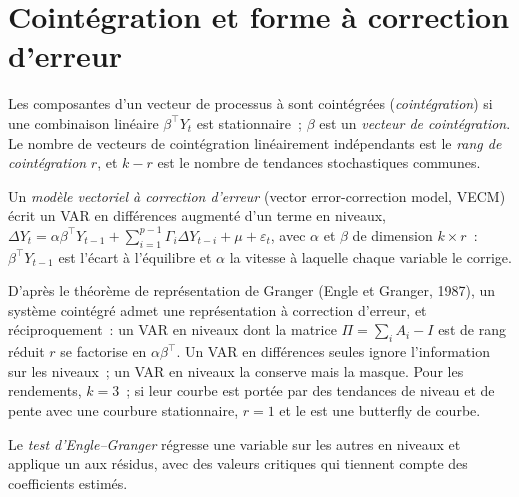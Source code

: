 \section{Cointégration et forme à correction d'erreur}

\begin{definition}\label{def:qm:multivariate-series-and-cointegration:coint}
Les composantes d'un vecteur de processus à  sont cointégrées (\emph{cointégration}) si une combinaison linéaire $\beta^\top Y_t$ est
stationnaire~; $\beta$ est un \emph{vecteur de cointégration}. Le nombre de vecteurs de cointégration linéairement indépendants est le
\emph{rang de cointégration} $r$, et $k - r$ est le nombre de tendances stochastiques communes.
\end{definition}

\begin{definition}\label{def:qm:multivariate-series-and-cointegration:vecm}
Un \emph{modèle vectoriel à correction d'erreur} (vector error-correction model, VECM) écrit un VAR en différences augmenté d'un terme en niveaux, $\Delta Y_t = \alpha\beta^\top Y_{t-1} +
\sum_{i=1}^{p-1}\Gamma_i\Delta Y_{t-i} + \mu + \varepsilon_t$, avec $\alpha$ et $\beta$ de dimension $k \times r$~: $\beta^\top Y_{t-1}$ est l'écart à l'équilibre
et $\alpha$ la vitesse à laquelle chaque variable le corrige.
\end{definition}

D'après le théorème de représentation de Granger (Engle et Granger, 1987), un système cointégré admet une représentation à correction d'erreur, et réciproquement~: un VAR en niveaux
dont la matrice $\Pi = \sum_iA_i - I$ est de rang réduit $r$ se factorise en $\alpha\beta^\top$. Un VAR en différences seules ignore l'information sur les niveaux~; un VAR en
niveaux la conserve mais la masque. Pour les rendements, $k = 3$~; si leur courbe est portée par des tendances de niveau et de pente avec une courbure stationnaire, $r = 1$ et le
 est une butterfly de courbe.

\begin{definition}\label{def:qm:multivariate-series-and-cointegration:eg}
Le \emph{test d'Engle--Granger} régresse une variable sur les autres en niveaux et applique un  aux résidus,
avec des valeurs critiques qui tiennent compte des coefficients estimés.
\end{definition}

